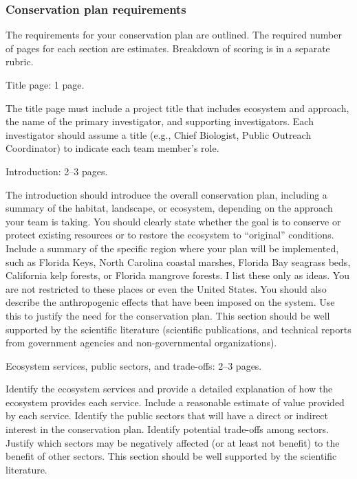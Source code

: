 \documentclass[12pt, hidelinks]{exam}
\begin{document}

\subsubsection*{Conservation plan requirements}

The requirements for your conservation plan are outlined. The required number of pages for each section are estimates. Breakdown of scoring is in a separate rubric.

\begin{questions}
	
	\question[5]
	Title page: 1 page.
	
	The title page must include a project title that includes ecosystem and approach, the name of the primary investigator, and supporting investigators. Each investigator should assume a title (e.g., Chief Biologist, Public Outreach Coordinator) to indicate each team member's role. 
	
	\question[15]
	Introduction: 2--3 pages.
	
	The introduction should introduce the overall conservation plan, including a summary of the habitat, landscape,  or ecosystem, depending on the approach your team is taking.  You should clearly state whether the goal is to conserve or protect existing resources or to restore the ecosystem to ``original'' conditions. Include a summary of the specific region where your plan will be implemented, such as Florida Keys, North Carolina coastal marshes, Florida Bay seagrass beds, California kelp forests, or Florida mangrove forests. I list these only as ideas. You are not restricted to these places or even the United States. You should also describe the anthropogenic effects that have been imposed on the system. Use this to justify the need for the conservation plan. This section should be well supported by the scientific literature (scientific publications,  and technical reports from government agencies and non-governmental organizations). 
	
	
	\question[20]
	Ecosystem services, public sectors, and trade-offs: 2--3 pages.
	
	Identify the ecosystem services and provide a detailed explanation of how the ecosystem provides each service. Include a reasonable estimate of value provided by each service. Identify the public sectors that will have a direct or indirect interest in the conservation plan. Identify potential trade-offs among sectors. Justify which sectors may be negatively affected (or at least not benefit) to the benefit of other sectors. This section should be well supported by the scientific literature.
	

\end{questions}
\end{document}
